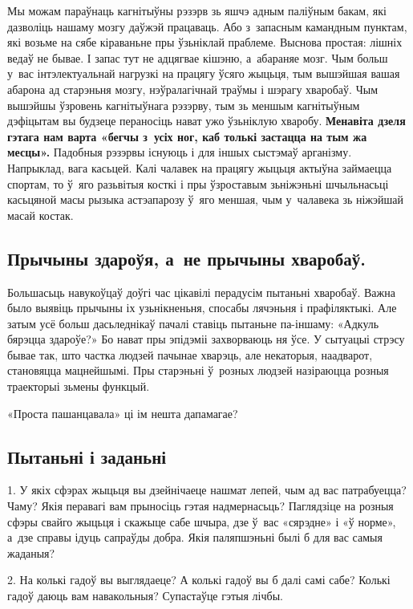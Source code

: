 Мы можам параўнаць кагнітыўны рэзэрв зь яшчэ адным паліўным бакам, які дазволіць нашаму мозгу даўжэй працаваць. Або з~запасным камандным пунктам, які возьме на сябе кіраваньне пры ўзьніклай праблеме. Выснова простая: лішніх ведаў не бывае. І запас тут не адцягвае кішэню, а~абараняе мозг. Чым больш у~вас інтэлектуальнай нагрузкі на працягу ўсяго жыцьця, тым вышэйшая вашая абарона ад старэньня мозгу, нэўралагічнай траўмы і шэрагу хваробаў. Чым вышэйшы ўзровень кагнітыўнага рэзэрву, тым зь меншым кагнітыўным дэфіцытам вы будзеце пераносіць нават ужо ўзьніклую хваробу. \textbf{Менавіта дзеля гэтага нам варта «бегчы з~усіх ног, каб толькі застацца на тым жа месцы».} Падобныя рэзэрвы існуюць і для іншых сыстэмаў арганізму. Напрыклад, вага касьцей. Калі чалавек на працягу жыцьця актыўна займаецца спортам, то ў~яго разьвітыя косткі і пры ўзроставым зьніжэньні шчыльнасьці касьцяной масы рызыка астэапарозу ў~яго меншая, чым у~чалавека зь ніжэйшай масай костак.

\subsection*{Прычыны здароўя, а~не прычыны хваробаў.}

Большасьць навукоўцаў доўгі час цікавілі перадусім пытаньні хваробаў. Важна было выявіць прычыны іх узьнікненьня, спосабы лячэньня і прафіляктыкі. Але затым усё больш дасьледнікаў пачалі ставіць пытаньне па-іншаму: «Адкуль бярэцца здароўе?» Бо нават пры эпідэміі захворваюць ня ўсе. У сытуацыі стрэсу бывае так, што частка людзей пачынае хварэць, але некаторыя, наадварот, становяцца мацнейшымі. Пры старэньні ў~розных людзей назіраюцца розныя траекторыі зьмены функцый. 

«Проста пашанцавала» ці ім нешта дапамагае?

\subsection*{Пытаньні і заданьні}

1. У якіх сфэрах жыцьця вы дзейнічаеце нашмат лепей, чым ад вас патрабуецца? Чаму? Якія перавагі вам прыносіць гэтая надмернасьць? Паглядзіце на розныя сфэры свайго жыцьця і скажыце сабе шчыра, дзе ў~вас «сярэдне» і «ў норме», а~дзе справы ідуць сапраўды добра. Якія паляпшэньні былі б для вас самыя жаданыя?

2. На колькі гадоў вы выглядаеце? А колькі гадоў вы б далі самі сабе? Колькі гадоў даюць вам навакольныя? Супастаўце гэтыя лічбы.

